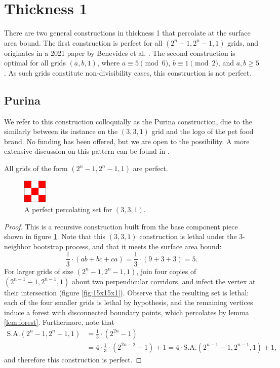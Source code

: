\section{Thickness 1}

There are two general constructions in thickness 1 that percolate at the surface area bound. The first construction is perfect for all $(2^n-1, 2^n-1, 1)$ grids, and originates in a 2021 paper by Benevides et al. \cite{benevides:2021}. The second construction is optimal for all grids $(a,b,1)$, where $a \equiv 5 \pmod 6$, $b \equiv 1 \pmod 2$, and $a,b \geq 5$. As such grids constitute non-divisibility cases, this construction is not perfect.

\subsection{Purina}

We refer to this construction colloquially as the Purina construction, due to the similarly between its instance on the $(3,3,1)$ grid and the logo of the pet food brand. No funding has been offered, but we are open to the possibility. A more extensive discussion on this pattern can be found in \cite{benevides:2021}.

\begin{con}
\label{con:purina}
All grids of the form $(2^n-1, 2^n-1, 1)$ are perfect.
\end{con}

\begin{figure}[]
\centering
\includegraphics[width=0.1\textwidth]{figures/4/3x3x1.pdf}
\caption{A perfect percolating set for $(3,3,1)$.}
\label{fig:3x3x1}
\end{figure} 

\begin{proof}
This is a recursive construction built from the base component piece shown in figure \ref{fig:3x3x1}. Note that this $(3,3,1)$ construction is lethal under the 3-neighbor bootstrap process, and that it meets the surface area bound:
$$\frac{1}{3} \cdot (ab+bc+ca) = \frac{1}{3} \cdot (9 + 3 + 3) = 5.$$
For larger grids of size $(2^n-1, 2^n-1, 1)$, join four copies of $(2^{n-1}-1, 2^{n-1}, 1)$ about two perpendicular corridors, and infect the vertex at their intersection (figure \ref{fig:15x15x1}). Observe that the resulting set is lethal: each of the four smaller grids is lethal by hypothesis, and the remaining vertices induce a forest with disconnected boundary points, which percolates by lemma \ref{lem:forest}. Furthermore, note that
\begin{align*}
\text{S.A.}(2^n-1,2^n-1,1) &= \frac{1}{3} \cdot (2^{2n}-1) \\
&= 4 \cdot \frac{1}{3} \cdot (2^{2n-2} -1) + 1 = 4 \cdot \text{S.A.}(2^{n-1}-1, 2^{n-1}, 1) + 1,
\end{align*}
and therefore this construction is perfect.
\end{proof}

